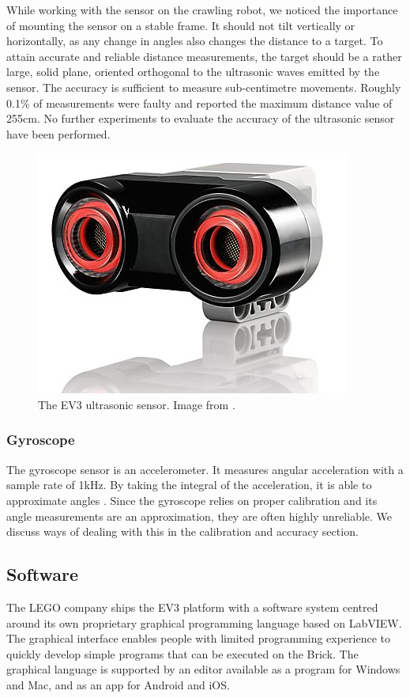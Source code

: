 \documentclass[11pt, a4paper]{article}
\begin{document}
While working with the sensor on the crawling robot, we noticed the importance of mounting the sensor on a stable frame. It should not tilt vertically or horizontally, as any change in angles also changes the distance to a target. To attain accurate and reliable distance measurements, the target should be a rather large, solid plane, oriented orthogonal to the ultrasonic waves emitted by the sensor. The accuracy is sufficient to measure sub-centimetre movements. Roughly 0.1\% of measurements were faulty and reported the maximum distance value of 255cm. No further experiments to evaluate the accuracy of the ultrasonic sensor have been performed.

\begin{figure}[H]
	\centering
	\includegraphics[width=0.3\linewidth]{images/ultrasonic}
	\caption{The EV3 ultrasonic sensor. Image from \cite{ultraosnic_sensor}.}
	\label{fig:ultrasonic}
\end{figure}

\subsubsection*{Gyroscope}
The gyroscope sensor is an accelerometer. It measures angular acceleration with a sample rate of 1kHz. By taking the integral of the acceleration, it is able to approximate angles \cite{gyroscope}. Since the gyroscope relies on proper calibration and its angle measurements are  an approximation, they are often highly unreliable. We discuss ways of dealing with this in the calibration and accuracy section.


\subsection{Software}
The LEGO company ships the EV3 platform with a software system centred around its own proprietary graphical programming language based on LabVIEW. The graphical interface enables people with limited programming experience to quickly develop simple programs that can be executed on the Brick. The graphical language is supported by an editor available as a program for Windows and Mac, and as an app for Android and iOS.
\end{document}
